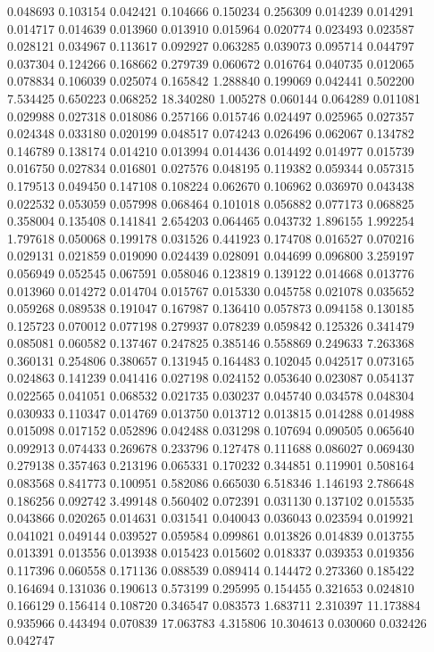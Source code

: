 0.048693
0.103154
0.042421
0.104666
0.150234
0.256309
0.014239
0.014291
0.014717
0.014639
0.013960
0.013910
0.015964
0.020774
0.023493
0.023587
0.028121
0.034967
0.113617
0.092927
0.063285
0.039073
0.095714
0.044797
0.037304
0.124266
0.168662
0.279739
0.060672
0.016764
0.040735
0.012065
0.078834
0.106039
0.025074
0.165842
1.288840
0.199069
0.042441
0.502200
7.534425
0.650223
0.068252
18.340280
1.005278
0.060144
0.064289
0.011081
0.029988
0.027318
0.018086
0.257166
0.015746
0.024497
0.025965
0.027357
0.024348
0.033180
0.020199
0.048517
0.074243
0.026496
0.062067
0.134782
0.146789
0.138174
0.014210
0.013994
0.014436
0.014492
0.014977
0.015739
0.016750
0.027834
0.016801
0.027576
0.048195
0.119382
0.059344
0.057315
0.179513
0.049450
0.147108
0.108224
0.062670
0.106962
0.036970
0.043438
0.022532
0.053059
0.057998
0.068464
0.101018
0.056882
0.077173
0.068825
0.358004
0.135408
0.141841
2.654203
0.064465
0.043732
1.896155
1.992254
1.797618
0.050068
0.199178
0.031526
0.441923
0.174708
0.016527
0.070216
0.029131
0.021859
0.019090
0.024439
0.028091
0.044699
0.096800
3.259197
0.056949
0.052545
0.067591
0.058046
0.123819
0.139122
0.014668
0.013776
0.013960
0.014272
0.014704
0.015767
0.015330
0.045758
0.021078
0.035652
0.059268
0.089538
0.191047
0.167987
0.136410
0.057873
0.094158
0.130185
0.125723
0.070012
0.077198
0.279937
0.078239
0.059842
0.125326
0.341479
0.085081
0.060582
0.137467
0.247825
0.385146
0.558869
0.249633
7.263368
0.360131
0.254806
0.380657
0.131945
0.164483
0.102045
0.042517
0.073165
0.024863
0.141239
0.041416
0.027198
0.024152
0.053640
0.023087
0.054137
0.022565
0.041051
0.068532
0.021735
0.030237
0.045740
0.034578
0.048304
0.030933
0.110347
0.014769
0.013750
0.013712
0.013815
0.014288
0.014988
0.015098
0.017152
0.052896
0.042488
0.031298
0.107694
0.090505
0.065640
0.092913
0.074433
0.269678
0.233796
0.127478
0.111688
0.086027
0.069430
0.279138
0.357463
0.213196
0.065331
0.170232
0.344851
0.119901
0.508164
0.083568
0.841773
0.100951
0.582086
0.665030
6.518346
1.146193
2.786648
0.186256
0.092742
3.499148
0.560402
0.072391
0.031130
0.137102
0.015535
0.043866
0.020265
0.014631
0.031541
0.040043
0.036043
0.023594
0.019921
0.041021
0.049144
0.039527
0.059584
0.099861
0.013826
0.014839
0.013755
0.013391
0.013556
0.013938
0.015423
0.015602
0.018337
0.039353
0.019356
0.117396
0.060558
0.171136
0.088539
0.089414
0.144472
0.273360
0.185422
0.164694
0.131036
0.190613
0.573199
0.295995
0.154455
0.321653
0.024810
0.166129
0.156414
0.108720
0.346547
0.083573
1.683711
2.310397
11.173884
0.935966
0.443494
0.070839
17.063783
4.315806
10.304613
0.030060
0.032426
0.042747
